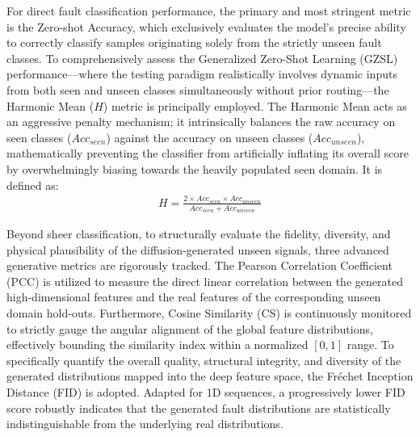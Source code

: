 For direct fault classification performance, the primary and most stringent metric is the Zero-shot Accuracy, which exclusively evaluates the model's precise ability to correctly classify samples originating solely from the strictly unseen fault classes. To comprehensively assess the Generalized Zero-Shot Learning (GZSL) performance—where the testing paradigm realistically involves dynamic inputs from both seen and unseen classes simultaneously without prior routing—the Harmonic Mean ($H$) metric is principally employed. The Harmonic Mean acts as an aggressive penalty mechanism; it intrinsically balances the raw accuracy on seen classes ($Acc_{seen}$) against the accuracy on unseen classes ($Acc_{unseen}$), mathematically preventing the classifier from artificially inflating its overall score by overwhelmingly biasing towards the heavily populated seen domain. It is defined as:
\begin{align}
    H = \frac{2 \times Acc_{seen} \times Acc_{unseen}}{Acc_{seen} + Acc_{unseen}} \label{eq:harmonic_mean}
\end{align}

Beyond sheer classification, to structurally evaluate the fidelity, diversity, and physical plausibility of the diffusion-generated unseen signals, three advanced generative metrics are rigorously tracked. The Pearson Correlation Coefficient (PCC) is utilized to measure the direct linear correlation between the generated high-dimensional features and the real features of the corresponding unseen domain hold-outs. 
Furthermore, Cosine Similarity (CS) is continuously monitored to strictly gauge the angular alignment of the global feature distributions, effectively bounding the similarity index within a normalized $[0, 1]$ range. To specifically quantify the overall quality, structural integrity, and diversity of the generated distributions mapped into the deep feature space, the Fréchet Inception Distance (FID) is adopted. Adapted for 1D sequences, a progressively lower FID score robustly indicates that the generated fault distributions are statistically indistinguishable from the underlying real distributions.

